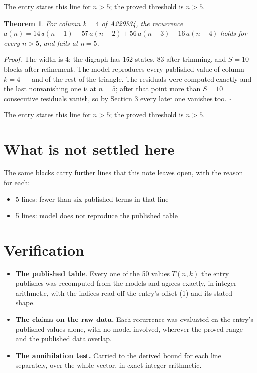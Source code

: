 \documentclass[11pt]{article}
\newtheorem{theorem}{Theorem}
\theoremstyle{definition}
\begin{document}
The entry states this line for $n > 5$; the proved threshold is $n > 5$.

\begin{theorem} For column $k = 4$ of A229534, the recurrence $a(n) = 14\,a(n-1) - 57\,a(n-2) + 56\,a(n-3) - 16\,a(n-4)$ holds for every $n > 5$, and fails at $n = 5$.\end{theorem}

{\itshape Proof.} The width is $4$; the digraph has $162$ states, $83$ after trimming, and $S = 10$ blocks after refinement. The model reproduces every published value of column $k = 4$ --- and of the rest of the triangle. The residuals were computed exactly and the last nonvanishing one is at $n = 5$; after that point more than $S = 10$ consecutive residuals vanish, so by Section 3 every later one vanishes too. $\square$

The entry states this line for $n > 5$; the proved threshold is $n > 5$.

\section{What is not settled here}

The same blocks carry further lines that this note leaves open, with the reason for each:

\begin{itemize}

\item 5 lines: fewer than six published terms in that line

\item 5 lines: model does not reproduce the published table

\end{itemize}

\section{Verification}

\begin{itemize}

\item {\bfseries The published table.} Every one of the 50 values $T(n,k)$ the entry publishes was recomputed from the models and agrees exactly, in integer arithmetic, with the indices read off the entry's offset (1) and its stated shape.

\item {\bfseries The claims on the raw data.} Each recurrence was evaluated on the entry's published values alone, with no model involved, wherever the proved range and the published data overlap.

\item {\bfseries The annihilation test.} Carried to the derived bound for each line separately, over the whole vector, in exact integer arithmetic.

\end{itemize}
\end{document}
